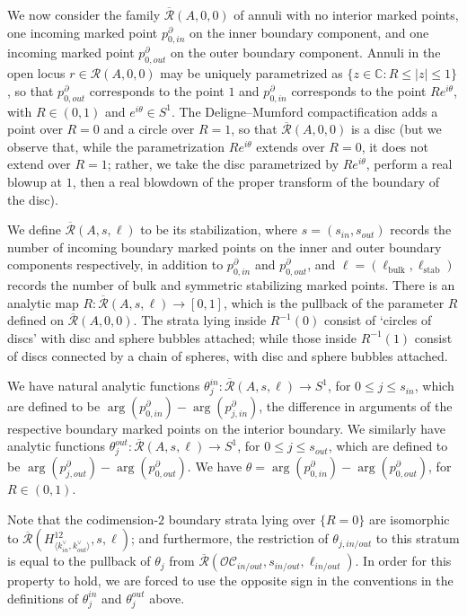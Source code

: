 \documentclass{article}
\def\cO{\mathcal{O}}
\def\cC{\mathcal{C}}
\def\cR{\mathcal{R}}
\def\Rbar{\overline{\mathcal{R}}}
\def\C{\mathbb{C}}
\def\stab{\mathrm{stab}}
\def\bulk{{\operatorname{bulk}}}
\begin{document}
We now consider the family $\Rbar(A,0,0)$ of annuli with no interior marked points, one incoming marked point $p_{0,in}^\partial$ on the inner boundary component, and one incoming marked point $p_{0,out}^\partial$ on the outer boundary component. 
Annuli in the open locus $r \in \cR(A,0,0)$ may be uniquely parametrized as $\{z \in \C: R \le |z| \le 1\}$, so that $p_{0,out}^\partial$ corresponds to the point $1$ and $p_{0,in}^\partial$ corresponds to the point $Re^{i\theta}$, with $R \in (0,1)$ and $e^{i\theta} \in S^1$. 
The Deligne--Mumford compactification adds a point over $R=0$ and a circle over $R=1$, so that $\Rbar(A,0,0)$ is a disc (but we observe that, while the parametrization $Re^{i\theta}$ extends over $R=0$, it does not extend over $R=1$; rather, we take the disc parametrized by $Re^{i\theta}$, perform a real blowup at $1$, then a real blowdown of the proper transform of the boundary of the disc).

We define $\Rbar(A,s,\ell)$ to be its stabilization, where $s=(s_{in},s_{out})$ records the number of incoming boundary marked points on the inner and outer boundary components respectively, in addition to $p_{0,in}^\partial$ and $p_{0,out}^\partial$, and $\ell = (\ell_{\bulk},\ell_{\stab})$ records the number of bulk and symmetric stabilizing marked points. 
There is an analytic map $R:\Rbar(A,s,\ell) \to [0,1]$, which is the pullback of the parameter $R$ defined on $\Rbar(A,0,0)$. 
The strata lying inside $R^{-1}(0)$ consist of `circles of discs' with disc and sphere bubbles attached; while those inside $R^{-1}(1)$ consist of discs connected by a chain of spheres, with disc and sphere bubbles attached. 

We have natural analytic functions $\theta_j^{in}:\Rbar(A,s,\ell) \to S^1$, for $0 \le j \le s_{in}$, which are defined to be $\arg(p_{0,in}^\partial) - \arg(p_{j,in}^\partial)$, the difference in arguments of the respective boundary marked points on the interior boundary. 
We similarly have analytic functions $\theta_j^{out}:\Rbar(A,s,\ell) \to S^1$, for $0 \le j \le s_{out}$, which are defined to be $\arg(p_{j,out}^\partial) - \arg(p_{0,out}^\partial)$. 
We have $\theta = \arg(p_{0,in}^\partial) - \arg(p_{0,out}^\partial)$, for $R \in (0,1)$.

Note that the codimension-$2$ boundary strata lying over $\{R=0\}$ are isomorphic to $\Rbar(H^{12}_{\langle k_{in}^\vee,k_{out}^\vee\rangle},s,\ell)$; and furthermore, the restriction of $\theta_{j,in/out}$ to this stratum is equal to the pullback of $\theta_j$ from $\Rbar(\cO\cC_{in/out},s_{in/out},\ell_{in/out})$.
In order for this property to hold, we are forced to use the opposite sign in the conventions in the definitions of $\theta_j^{in}$ and $\theta_j^{out}$ above. 
\end{document}
